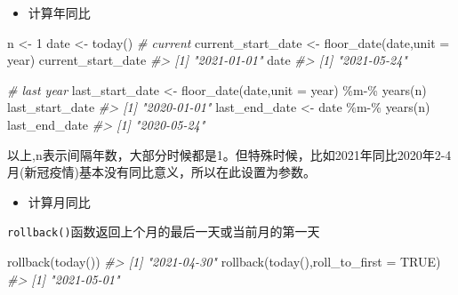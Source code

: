 \documentclass[
]{book}
\newenvironment{Shaded}{\begin{snugshade}}{\end{snugshade}}
\newcommand{\AttributeTok}[1]{\textcolor[rgb]{0.77,0.63,0.00}{#1}}
\newcommand{\CommentTok}[1]{\textcolor[rgb]{0.56,0.35,0.01}{\textit{#1}}}
\newcommand{\ConstantTok}[1]{\textcolor[rgb]{0.00,0.00,0.00}{#1}}
\newcommand{\DecValTok}[1]{\textcolor[rgb]{0.00,0.00,0.81}{#1}}
\newcommand{\FunctionTok}[1]{\textcolor[rgb]{0.00,0.00,0.00}{#1}}
\newcommand{\NormalTok}[1]{#1}
\newcommand{\OtherTok}[1]{\textcolor[rgb]{0.56,0.35,0.01}{#1}}
\newcommand{\SpecialCharTok}[1]{\textcolor[rgb]{0.00,0.00,0.00}{#1}}
\newcommand{\StringTok}[1]{\textcolor[rgb]{0.31,0.60,0.02}{#1}}
\providecommand{\tightlist}{%
  \setlength{\itemsep}{0pt}\setlength{\parskip}{0pt}}
\begin{document}
\begin{itemize}
\tightlist
\item
  计算年同比
\end{itemize}

\begin{Shaded}
\begin{Highlighting}[]
\NormalTok{n }\OtherTok{\textless{}{-}} \DecValTok{1} 
\NormalTok{date }\OtherTok{\textless{}{-}} \FunctionTok{today}\NormalTok{()}
\CommentTok{\# current }
\NormalTok{current\_start\_date }\OtherTok{\textless{}{-}}  \FunctionTok{floor\_date}\NormalTok{(date,}\AttributeTok{unit =} \StringTok{\textquotesingle{}year\textquotesingle{}}\NormalTok{)}
\NormalTok{current\_start\_date}
\CommentTok{\#\textgreater{} [1] "2021{-}01{-}01"}
\NormalTok{date }
\CommentTok{\#\textgreater{} [1] "2021{-}05{-}24"}

\CommentTok{\# last year}
\NormalTok{last\_start\_date }\OtherTok{\textless{}{-}} \FunctionTok{floor\_date}\NormalTok{(date,}\AttributeTok{unit =} \StringTok{\textquotesingle{}year\textquotesingle{}}\NormalTok{) }\SpecialCharTok{\%m{-}\%} \FunctionTok{years}\NormalTok{(n)}
\NormalTok{last\_start\_date}
\CommentTok{\#\textgreater{} [1] "2020{-}01{-}01"}
\NormalTok{last\_end\_date }\OtherTok{\textless{}{-}}\NormalTok{ date }\SpecialCharTok{\%m{-}\%} \FunctionTok{years}\NormalTok{(n)}
\NormalTok{last\_end\_date}
\CommentTok{\#\textgreater{} [1] "2020{-}05{-}24"}
\end{Highlighting}
\end{Shaded}

以上,n表示间隔年数，大部分时候都是1。但特殊时候，比如2021年同比2020年2-4月(新冠疫情)基本没有同比意义，所以在此设置为参数。

\begin{itemize}
\tightlist
\item
  计算月同比
\end{itemize}

\texttt{rollback()}函数返回上个月的最后一天或当前月的第一天

\begin{Shaded}
\begin{Highlighting}[]
\FunctionTok{rollback}\NormalTok{(}\FunctionTok{today}\NormalTok{())}
\CommentTok{\#\textgreater{} [1] "2021{-}04{-}30"}
\FunctionTok{rollback}\NormalTok{(}\FunctionTok{today}\NormalTok{(),}\AttributeTok{roll\_to\_first =} \ConstantTok{TRUE}\NormalTok{)}
\CommentTok{\#\textgreater{} [1] "2021{-}05{-}01"}
\end{Highlighting}
\end{Shaded}
\end{document}
